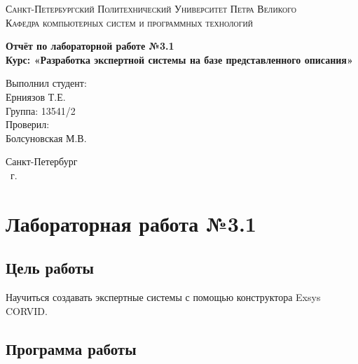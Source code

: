 \documentclass[14pt,a4paper,report]{report}
\begin{document}
\def\contentsname{Содержание}

\begin{titlepage}
	\begin{center}
		\textsc{Санкт-Петербургский Политехнический 
			Университет Петра Великого\\[5mm]
			Кафедра компьютерных систем и программных технологий}
		
		\vfill
		
		\textbf{Отчёт по лабораторной работе №3.1\\[3mm]
			Курс: «Разработка экспертной системы на базе представленного описания»\\[41mm]
		}
	\end{center}
	
	\hfill
	\begin{minipage}{.4\textwidth}
		Выполнил студент:\\[2mm] 
		Ерниязов Т.Е.\\
		Группа: 13541/2\\[5mm]
		
		Проверил:\\[2mm] 
		Болсуновская М.В.
	\end{minipage}
	\vfill
	\begin{center}
		Санкт-Петербург\\ \the\year\ г.
	\end{center}
\end{titlepage}

\tableofcontents
\clearpage

\chapter{Лабораторная работа №3.1}

\section{Цель работы}

Научиться создавать экспертные системы с помощью конструктора Exsys CORVID.

\section{Программа работы}
\end{document}
